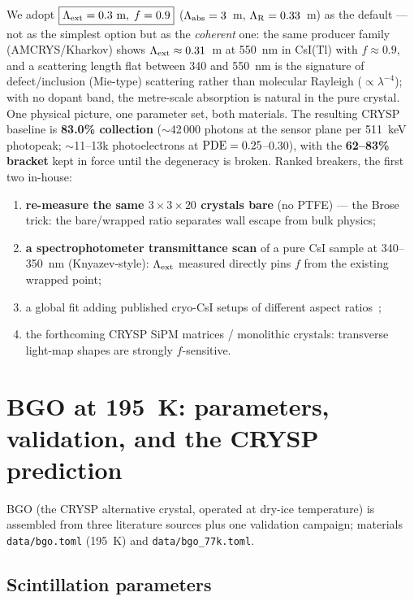 \documentclass[11pt,a4paper]{article}
\newcommand{\csitl}{CsI(Tl)}
\newcommand{\lext}{\Lambda_{\rm ext}}
\newcommand{\labs}{\Lambda_{\rm abs}}
\newcommand{\lray}{\Lambda_{\rm R}}
\begin{document}
We adopt $\boxed{\lext = 0.3~\text{m},\; f = 0.9}$
($\labs = 3$~m, $\lray = 0.33$~m) as the default --- not as the simplest option but as
the \emph{coherent} one: the same producer family (AMCRYS/Kharkov) shows
$\lext \approx 0.31$~m at 550~nm in \csitl{} with $f \approx 0.9$, and a scattering
length flat between 340 and 550~nm is the signature of defect/inclusion (Mie-type)
scattering rather than molecular Rayleigh ($\propto \lambda^{-4}$); with no dopant band,
the metre-scale absorption is natural in the pure crystal. One physical picture, one
parameter set, both materials. The resulting CRYSP baseline is
\textbf{83.0\% collection} ($\sim$42\,000 photons at the sensor plane per 511~keV
photopeak; $\sim$11--13k photoelectrons at ${\rm PDE} = 0.25$--0.30), with the
\textbf{62--83\% bracket} kept in force until the degeneracy is broken. Ranked breakers,
the first two in-house:
\begin{enumerate}
  \item \textbf{re-measure the same $3\times3\times20$ crystals bare} (no PTFE) --- the
    Brose trick: the bare/wrapped ratio separates wall escape from bulk physics;
  \item \textbf{a spectrophotometer transmittance scan} of a pure CsI sample at
    340--350~nm (Knyazev-style): $\lext$ measured directly pins $f$ from the existing
    wrapped point;
  \item a global fit adding published cryo-CsI setups of different aspect
    ratios~\cite{ding2022,wang2024};
  \item the forthcoming CRYSP SiPM matrices / monolithic crystals: transverse light-map
    shapes are strongly $f$-sensitive.
\end{enumerate}

\section{BGO at 195~K: parameters, validation, and the CRYSP prediction}
\label{sec:bgo}

BGO (the CRYSP alternative crystal, operated at dry-ice temperature) is assembled from
three literature sources plus one validation campaign; materials
\texttt{data/bgo.toml} (195~K) and \texttt{data/bgo\_77k.toml}.

\subsection{Scintillation parameters}
\end{document}
